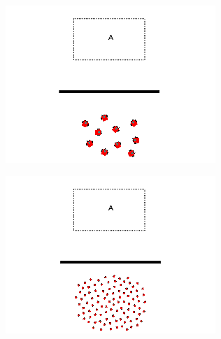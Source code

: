 \begin{figure}
\begin{subfigure}{0.4\textwidth}
		\includegraphics[width=\linewidth]{../ui_experiment/slide_images/Swarm_Robot_Control_-_10_Robot_0005.png}
	\end{subfigure}
	\begin{subfigure}{0.4\textwidth}
		\includegraphics[width=\linewidth]{../ui_experiment/slide_images/Swarm_Robot_Control_-_100_Robot_0005.png}
	\end{subfigure}
	\begin{subfigure}{0.4\textwidth}

\end{subfigure}
\end{figure}
